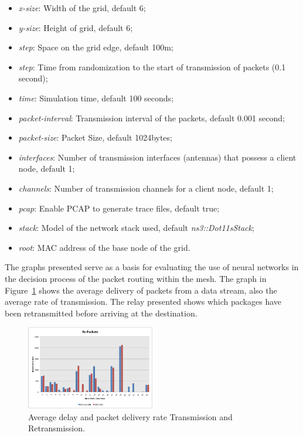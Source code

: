 \documentclass[10pt, conference, compsocconf]{IEEEtran}
\begin{document}
\begin{itemize}
	\item \emph{x-size}: Width of the grid, default 6;
	\item \emph{y-size}: Height of grid, default 6;
	\item \emph{step}: Space on the grid edge, default 100m;
	\item \emph{step}: Time from randomization to the start of transmission of packets (0.1 second);
	\item \emph{time}: Simulation time, default 100 seconds;
	\item \emph{packet-interval}: Transmission interval of the packets, default 0.001 second;
	\item \emph{packet-size}: Packet Size, default 1024bytes;
	\item \emph{interfaces}: Number of transmission interfaces (antennas) that possess a client node, default 1;
	\item \emph{channels}: Number of transmission channels for a client node, default 1;
	\item \emph{pcap}: Enable PCAP to generate trace files, default true;
	\item \emph{stack}: Model of the network stack used, default \emph{ns3::Dot11sStack};
	\item \emph{root}: MAC address of the base node of the grid.
\end{itemize}

The graphs presented serve as a basis for evaluating the use of neural networks in the decision process of the packet routing within the mesh. The graph in Figure~\ref{fig:g1} shows the average delivery of packets from a data stream, also the average rate of transmission. The relay presented shows which packages have been retransmitted before arriving at the destination.

\begin{figure}[h]
	\centering
	\includegraphics[width=0.5\textwidth]{./graphics/image007.png}
    \caption{ Average delay and packet delivery rate Transmission and Retransmission.}
    \label{fig:g1}
\end{figure}
\end{document}
